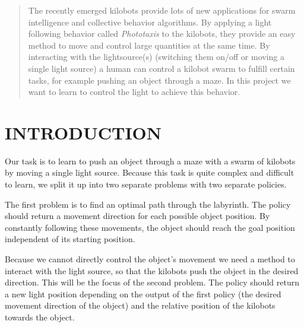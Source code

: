 \documentclass[twoside]{article}
\begin{document}

\begin{abstract}
The recently emerged kilobots provide lots of new applications for swarm
intelligence and collective behavior algorithms. By applying a light following
behavior called \emph{Phototaxis} to the kilobots, they provide an easy method
to move and control large quantities at the same time. By interacting with the
lightsource(s) (switching them on/off or moving a single light source) a human
can control a kilobot swarm to fulfill certain tasks, for example pushing an
object through a maze\cite{kilobotMaze}. In this project we want to learn to
control the light to achieve this behavior.
\end{abstract}

\section{INTRODUCTION}

Our task is to learn to push an object through a maze with a swarm of kilobots
by moving a single light source. Because this task is quite complex and
difficult to learn, we split it up into two separate problems with two separate
policies.

The first problem is to find an optimal path through the labyrinth. The policy
should return a movement direction for each possible object position. By
constantly following these movements, the object should reach the goal position
independent of its starting position.

Because we cannot directly control the object's movement we need a method to
interact with the light source, so that the kilobots push the object in the
desired direction. This will be the focus of the second problem. The policy
should return a new light position depending on the output of the first policy
(the desired movement direction of the object) and the relative position of the
kilobots towards the object.
\end{document}
